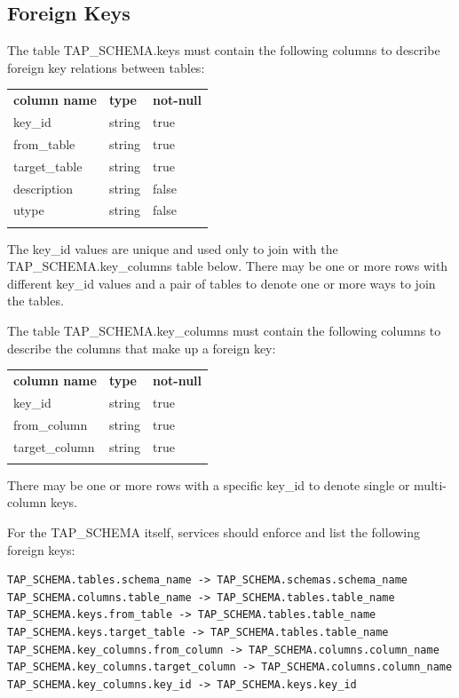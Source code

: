 \documentclass[11pt,letter]{ivoa}
\newcommand{\tapschema}{TAP\_SCHEMA}
\newcommand{\tapschema}{\mbox{%
  \relsize{-0.5}TAP\discretionary{-}{}{\kern-2pt\_}SCHEMA}}
\begin{document}
\subsection{Foreign Keys}
\label{sec:tap-schema-keys}
The table \tapschema.keys must contain the following columns to 
describe foreign key relations between tables:

\begin{inlinetable}
\begin{tabular}{l l l}
\sptablerule
\textbf{column name} & \textbf{type} & \textbf{not-null} \\
\sptablerule
key\_id & string & true \\
from\_table & string & true \\
target\_table & string & true \\
description & string & false \\
utype & string & false \\
\sptablerule
\end{tabular}
\end{inlinetable}

The key\_id values are unique and used only to join with the 
\tapschema.key\_columns table below. There may be 
one or more rows with different key\_id values and a pair 
of tables to denote one or more ways to join the tables.

The table \tapschema.key\_columns must contain the 
following columns to describe the columns that make up a foreign key:

\begin{inlinetable}
\begin{tabular}{l l l}
\sptablerule
\textbf{column name} & \textbf{type} & \textbf{not-null} \\
\sptablerule
key\_id & string & true \\
from\_column & string & true \\
target\_column & string & true \\
\sptablerule
\end{tabular}
\end{inlinetable}

There may be one or more rows with a specific key\_id to 
denote single or multi-column keys.

For the \tapschema{} itself, services should enforce and list the following foreign keys:

\begin{verbatim}
TAP_SCHEMA.tables.schema_name -> TAP_SCHEMA.schemas.schema_name
TAP_SCHEMA.columns.table_name -> TAP_SCHEMA.tables.table_name
TAP_SCHEMA.keys.from_table -> TAP_SCHEMA.tables.table_name
TAP_SCHEMA.keys.target_table -> TAP_SCHEMA.tables.table_name
TAP_SCHEMA.key_columns.from_column -> TAP_SCHEMA.columns.column_name
TAP_SCHEMA.key_columns.target_column -> TAP_SCHEMA.columns.column_name
TAP_SCHEMA.key_columns.key_id -> TAP_SCHEMA.keys.key_id
\end{verbatim}
\end{document}
